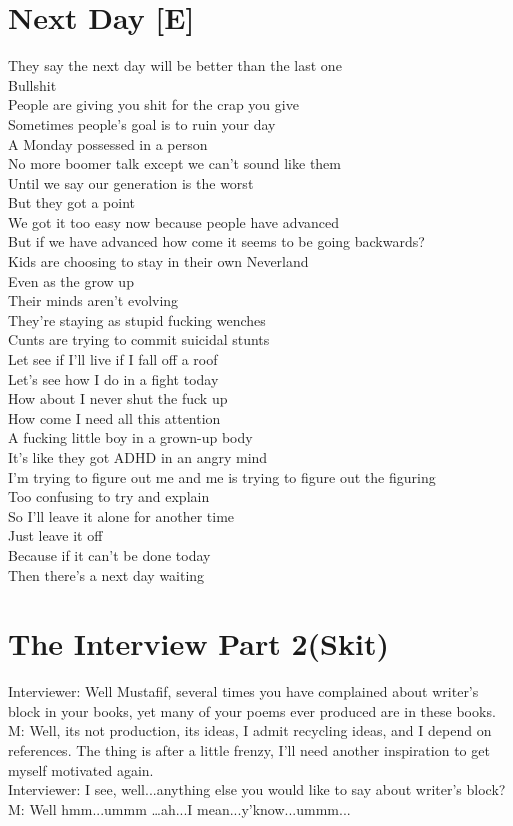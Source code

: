 \documentclass[12pt, b5paper, oneside]{book}
\begin{document}
\section{Next Day [E]}
They say the next day will be better than the last one
\\Bullshit
\\People are giving you shit for the crap you give
\\Sometimes people's goal is to ruin your day
\\A Monday possessed in a person
\\No more boomer talk except we can't sound like them
\\Until we say our generation is the worst
\\But they got a point
\\We got it too easy now because people have advanced
\\But if we have advanced how come it seems to be going backwards?
\\Kids are choosing to stay in their own Neverland
\\Even as the grow up
\\Their minds aren't evolving
\\They're staying as stupid fucking wenches
\\Cunts are trying to commit suicidal stunts
\\Let see if I'll live if I fall off a roof
\\Let's see how I do in a fight today
\\How about I never shut the fuck up
\\How come I need all this attention
\\A fucking little boy in a  grown-up body
\\It's like they got ADHD in an angry mind
\\I'm trying to figure out me and me is trying to figure out the figuring
\\Too confusing to try and explain
\\So I'll leave it alone for another time
\\Just leave it off
\\Because if it can't be done today
\\Then there's a next day waiting 
\newpage
\section{The Interview Part 2(Skit)}
Interviewer: Well Mustafif, several times you have complained about writer's block in your books, yet 
many of your poems ever produced are in these books. 
\\M: Well, its not production, its ideas, I admit recycling ideas, and I depend on references. The thing is after 
a little frenzy, I'll need another inspiration to get myself motivated again. 
\\Interviewer: I see, well...anything else you would like to say about writer's block?
\\M: Well hmm...ummm \dots ah...I mean...y'know...ummm...
\end{document}
